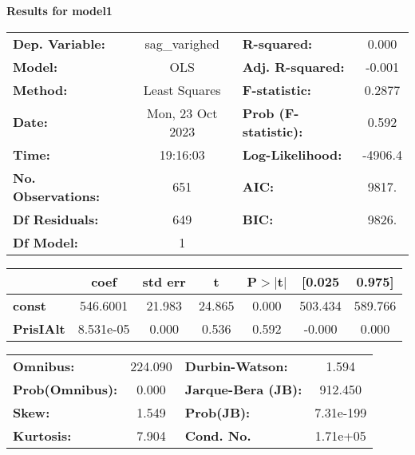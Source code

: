 \textbf{Results for model1} \\ 
\begin{center}
\begin{tabular}{lclc}
\toprule
\textbf{Dep. Variable:}    &  sag\_varighed   & \textbf{  R-squared:         } &     0.000   \\
\textbf{Model:}            &       OLS        & \textbf{  Adj. R-squared:    } &    -0.001   \\
\textbf{Method:}           &  Least Squares   & \textbf{  F-statistic:       } &    0.2877   \\
\textbf{Date:}             & Mon, 23 Oct 2023 & \textbf{  Prob (F-statistic):} &    0.592    \\
\textbf{Time:}             &     19:16:03     & \textbf{  Log-Likelihood:    } &   -4906.4   \\
\textbf{No. Observations:} &         651      & \textbf{  AIC:               } &     9817.   \\
\textbf{Df Residuals:}     &         649      & \textbf{  BIC:               } &     9826.   \\
\textbf{Df Model:}         &           1      & \textbf{                     } &             \\
\bottomrule
\end{tabular}
\begin{tabular}{lcccccc}
                  & \textbf{coef} & \textbf{std err} & \textbf{t} & \textbf{P$> |$t$|$} & \textbf{[0.025} & \textbf{0.975]}  \\
\midrule
\textbf{const}    &     546.6001  &       21.983     &    24.865  &         0.000        &      503.434    &      589.766     \\
\textbf{PrisIAlt} &    8.531e-05  &        0.000     &     0.536  &         0.592        &       -0.000    &        0.000     \\
\bottomrule
\end{tabular}
\begin{tabular}{lclc}
\textbf{Omnibus:}       & 224.090 & \textbf{  Durbin-Watson:     } &     1.594  \\
\textbf{Prob(Omnibus):} &   0.000 & \textbf{  Jarque-Bera (JB):  } &   912.450  \\
\textbf{Skew:}          &   1.549 & \textbf{  Prob(JB):          } & 7.31e-199  \\
\textbf{Kurtosis:}      &   7.904 & \textbf{  Cond. No.          } &  1.71e+05  \\
\bottomrule
\end{tabular}
\end{center}

